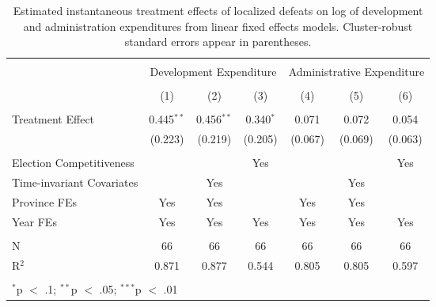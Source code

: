 
\begin{table}[!htbp] \centering 
  \caption{Estimated instantaneous treatment effects of localized defeats on log of development and administration expenditures from linear fixed effects models. Cluster-robust standard errors appear in parentheses.} 
  \label{tab:lfe_mech} 
\begin{tabular}{@{\extracolsep{5pt}}lcccccc} 
\\[-1.8ex]\hline 
\hline \\[-1.8ex] 
 & \multicolumn{3}{c}{Development Expenditure} & \multicolumn{3}{c}{Administrative Expenditure} \\ 
\\[-1.8ex] & (1) & (2) & (3) & (4) & (5) & (6)\\ 
\hline \\[-1.8ex] 
 Treatment Effect & 0.445$^{**}$ & 0.456$^{**}$ & 0.340$^{*}$ & 0.071 & 0.072 & 0.054 \\ 
  & (0.223) & (0.219) & (0.205) & (0.067) & (0.069) & (0.063) \\ 
 \hline \\[-1.8ex] 
Election Competitiveness &  &  & Yes &  &  & Yes \\ 
Time-invariant Covariates &  & Yes &  &  & Yes &  \\ 
Province FEs & Yes & Yes &  & Yes & Yes &  \\ 
Year FEs & Yes & Yes & Yes & Yes & Yes & Yes \\ 
\hline \\[-1.8ex] 
N & 66 & 66 & 66 & 66 & 66 & 66 \\ 
R$^{2}$ & 0.871 & 0.877 & 0.544 & 0.805 & 0.805 & 0.597 \\ 
\hline 
\hline \\[-1.8ex] 
\multicolumn{7}{l}{$^{*}$p $<$ .1; $^{**}$p $<$ .05; $^{***}$p $<$ .01} \\ 
\end{tabular} 
\end{table} 
